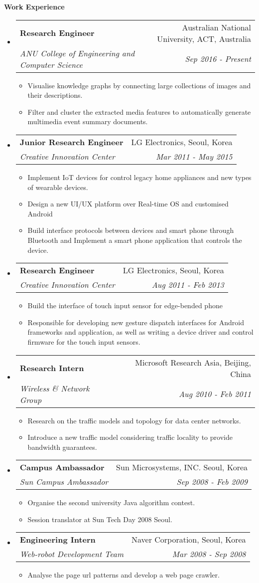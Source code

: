 \documentclass[letterpaper,11pt]{article}
\makeatletter
\newcommand{\resitem}[1]{\item #1 \vspace{-2pt}}
\newcommand{\resheading}[1]{{\large \colorbox{mygrey}{\begin{minipage}{\textwidth}{\textbf{#1 \vphantom{p\^{E}}}}\end{minipage}}}}
\newcommand{\ressubheading}[4]{
\begin{tabular*}{7.0in}{l@{\extracolsep{\fill}}r}
		\textbf{#1} & #2 \\
		\textit{#3} & \textit{#4} \\
\end{tabular*}\vspace{-6pt}}
\makeatother
\begin{document}
\resheading{Work Experience}
\begin{itemize}
\item
	\ressubheading{Research Engineer}{Australian National University, ACT, Australia}{ANU College of Engineering and Computer Science}{Sep 2016 - Present}
	\begin{itemize}
		\resitem{Visualise knowledge graphs by connecting large collections of images and their descriptions.}
		\resitem{Filter and cluster the extracted media features to automatically generate multimedia event summary documents.}
	\end{itemize}
	
\item
	\ressubheading{Junior Research Engineer}{LG Electronics, Seoul, Korea}{Creative Innovation Center}{Mar 2011 - May 2015}
	\begin{itemize}
		\resitem{Implement IoT devices for control legacy home appliances and new types of wearable devices.}
		\resitem{Design a new UI/UX platform over Real-time OS and customised Android}
		\resitem{Build interface protocols between devices and smart phone through Bluetooth and Implement a smart phone application that controls the device.}
	\end{itemize}
\item
	\ressubheading{Research Engineer}{LG Electronics, Seoul, Korea}{Creative Innovation Center}{Aug 2011 - Feb 2013}
	\begin{itemize}
		\resitem{Build the interface of touch input sensor for edge-bended phone}
		\resitem{Responsible for developing new gesture dispatch interfaces for Android frameworks and application, as well as writing a device driver and control firmware for the touch input sensors.}
	\end{itemize}

\item
	\ressubheading{Research Intern}{Microsoft Research Asia, Beijing, China}{Wireless \& Network Group}{Aug 2010 - Feb 2011}
	\begin{itemize}
		\resitem{Research on the traffic models and topology for data center networks.}
        \resitem{Introduce a new traffic model considering traffic locality to provide bandwidth guarantees.}
	\end{itemize}

\item
	\ressubheading{Campus Ambassador}{Sun Microsystems, INC. Seoul, Korea}{Sun Campus Ambassador}{Sep 2008 - Feb 2009}
	\begin{itemize}
		\resitem{Organise the second university Java algorithm contest.}
        \resitem{Session translator at Sun Tech Day 2008 Seoul.}
	\end{itemize}

\item
	\ressubheading{Engineering Intern}{Naver Corporation, Seoul, Korea}{Web-robot Development Team}{Mar 2008 - Sep 2008}
	\begin{itemize}
		\resitem{Analyse the page url patterns and develop a web page crawler.}
	\end{itemize}

\end{itemize}
\end{document}
